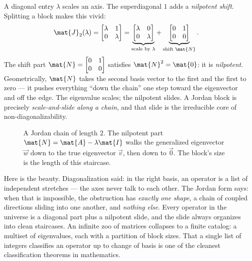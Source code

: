 A diagonal entry $\lambda$ scales an axis. The superdiagonal $1$ adds a \emph{nilpotent
shift}. Splitting a block makes this vivid:
\[
\mat{J}_2(\lambda)=\begin{bmatrix}\lambda&1\\0&\lambda\end{bmatrix}
=\underbrace{\begin{bmatrix}\lambda&0\\0&\lambda\end{bmatrix}}_{\text{scale by }\lambda}
+\underbrace{\begin{bmatrix}0&1\\0&0\end{bmatrix}}_{\text{shift }\mat{N}}.
\]
The shift part $\mat{N}=\begin{bmatrix}0&1\\0&0\end{bmatrix}$ satisfies $\mat{N}^2=\mat{0}$:
it is \emph{nilpotent}. Geometrically, $\mat{N}$ takes the second basis vector to the
first and the first to zero --- it pushes everything ``down the chain'' one step toward
the eigenvector and off the edge. The eigenvalue scales; the nilpotent slides. A Jordan
block is precisely \emph{scale-and-slide along a chain}, and that slide is the irreducible
core of non-diagonalizability.

\begin{figure}[H]
\centering
{}
\caption{A Jordan chain of length $2$. The nilpotent part $\mat{N}=\mat{A}-\lambda\mat{I}$
walks the generalized eigenvector $\vec{w}$ down to the true eigenvector $\vec{v}$, then
down to $\vec{0}$. The block's size is the length of this staircase.}
\label{ch28:chain}
\end{figure}

\begin{aestheticbox}
Here is the beauty. Diagonalization said: in the right basis, an operator is a list of
independent stretches --- the axes never talk to each other. The Jordan form says: when
that is impossible, the obstruction has \emph{exactly one shape}, a chain of coupled
directions sliding into one another, and \emph{nothing else}. Every operator in the
universe is a diagonal part plus a nilpotent slide, and the slide always organizes into
clean staircases. An infinite zoo of matrices collapses to a finite catalog: a multiset
of eigenvalues, each with a partition of block sizes. That a single list of integers
classifies an operator up to change of basis is one of the cleanest classification
theorems in mathematics.
\end{aestheticbox}

